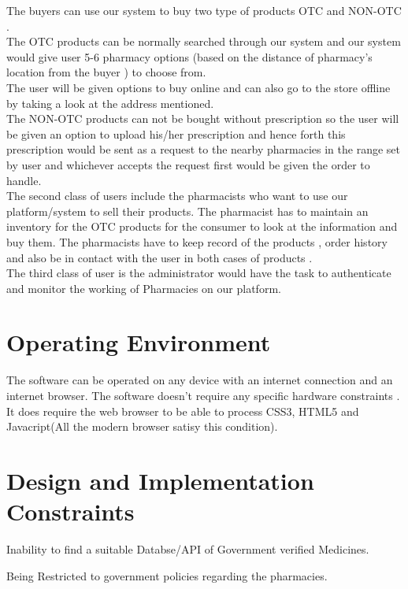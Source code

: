 \documentclass{scrreprt}
\begin{document}
The buyers can use our system to buy two type of products OTC and NON-OTC .   \\

The OTC products can be normally searched through our system and our system would give user 5-6 pharmacy options (based on the distance of pharmacy’s location from the buyer ) to choose from.     \\

The user will be given options to buy online and can also go to the store offline by taking a look at the address mentioned.  \\

The NON-OTC products can not be bought without prescription so the user will be given an option to upload his/her prescription and hence forth this prescription would be sent as a request to the nearby pharmacies in the range set by user and whichever accepts the request first would be given the order to handle.   \\

The second class of users include the pharmacists who want to use our platform/system to sell their products. The pharmacist has to maintain an inventory for the OTC products for the consumer to look at the information and buy them. The pharmacists have to keep record of the products , order history and also be in contact with the user in both cases of products .   \\

The third class of user is the administrator would have the task to authenticate and monitor the working of Pharmacies on our platform.   \\


\section{Operating Environment}
The software can be operated on any device with an internet connection and an internet browser. The software doesn’t require any specific hardware constraints . It does require the web browser to be able to process CSS3, HTML5 and Javacript(All the modern browser satisy this condition).


\section{Design and Implementation Constraints}
\item Inability to find a suitable Databse/API of Government verified Medicines.
\item Being Restricted to government policies regarding the pharmacies.
\end{document}

